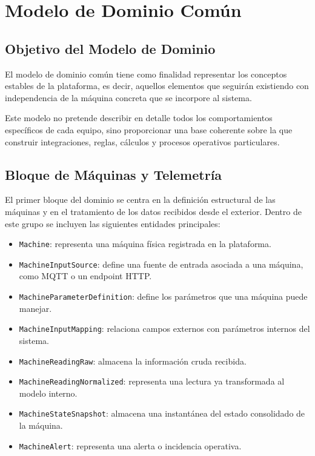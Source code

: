 \section{Modelo de Dominio Común}

\subsection{Objetivo del Modelo de Dominio}

El modelo de dominio común tiene como finalidad representar los conceptos estables de la plataforma, es decir, aquellos elementos que seguirán existiendo con independencia de la máquina concreta que se incorpore al sistema.

Este modelo no pretende describir en detalle todos los comportamientos específicos de cada equipo, sino proporcionar una base coherente sobre la que construir integraciones, reglas, cálculos y procesos operativos particulares.

\subsection{Bloque de Máquinas y Telemetría}

El primer bloque del dominio se centra en la definición estructural de las máquinas y en el tratamiento de los datos recibidos desde el exterior. Dentro de este grupo se incluyen las siguientes entidades principales:

\begin{itemize}
    \item \texttt{Machine}: representa una máquina física registrada en la plataforma.
    \item \texttt{MachineInputSource}: define una fuente de entrada asociada a una máquina, como MQTT o un endpoint HTTP.
    \item \texttt{MachineParameterDefinition}: define los parámetros que una máquina puede manejar.
    \item \texttt{MachineInputMapping}: relaciona campos externos con parámetros internos del sistema.
    \item \texttt{MachineReadingRaw}: almacena la información cruda recibida.
    \item \texttt{MachineReadingNormalized}: representa una lectura ya transformada al modelo interno.
    \item \texttt{MachineStateSnapshot}: almacena una instantánea del estado consolidado de la máquina.
    \item \texttt{MachineAlert}: representa una alerta o incidencia operativa.
\end{itemize}

